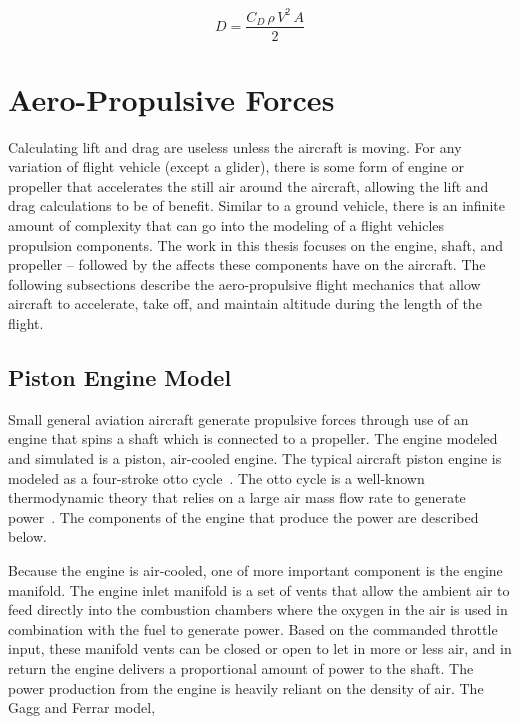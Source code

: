 \begin{equation}\label{eq:drag}
    D = \frac{C_D \, \rho \, V^2 \, A}{2}
\end{equation}



\section{Aero-Propulsive Forces}

Calculating lift and drag are useless unless the aircraft is moving. For any variation of flight vehicle (except a glider), there is some form of engine or propeller that accelerates the still air around the aircraft, allowing the lift and drag calculations to be of benefit. Similar to a ground vehicle, there is an infinite amount of complexity that can go into the modeling of a flight vehicles propulsion components. The work in this thesis focuses on the engine, shaft, and propeller {--} followed by the affects these components have on the aircraft. The following subsections describe the aero-propulsive flight mechanics that allow aircraft to accelerate, take off, and maintain altitude during the length of the flight.

\subsection{Piston Engine Model}
Small general aviation aircraft generate propulsive forces through use of an engine that spins a shaft which is connected to a propeller. The engine modeled and simulated is a piston, air-cooled engine. The typical aircraft piston engine is modeled as a four-stroke otto cycle~\cite{raymerAircraftDesignConceptual2018}. The otto cycle is a well-known thermodynamic theory that relies on a large air mass flow rate to generate power~\cite{gudmundssonGeneralAviationAircraft2014}. The components of the engine that produce the power are described below.

Because the engine is air-cooled, one of more important component is the engine manifold. The engine inlet manifold is a set of vents that allow the ambient air to feed directly into the combustion chambers where the oxygen in the air is used in combination with the fuel to generate power. Based on the commanded throttle input, these manifold vents can be closed or open to let in more or less air, and in return the engine delivers a proportional amount of power to the shaft. The power production from the engine is heavily reliant on the density of air. The Gagg and Ferrar model,

